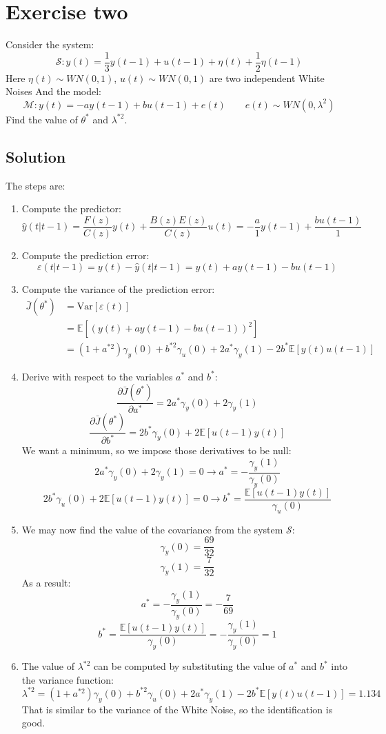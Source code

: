 \section{Exercise two}

Consider the system: 
\[\mathcal{S}:y(t)=\dfrac{1}{3}y(t-1)+u(t-1)+\eta(t)+\dfrac{1}{2}\eta(t-1)\]
Here $\eta(t)\sim WN(0,1)$, $u(t)\sim WN(0,1)$ are two independent White Noises
And the model: 
\[\mathcal{M}:y(t)=-ay(t-1)+bu(t-1)+e(t) \qquad e(t)\sim WN(0,\lambda^2)\]
Find the value of $\theta^\ast$ and $\lambda^{\ast 2}$. 

\subsection*{Solution}
The steps are: 
\begin{enumerate}
    \item Compute the predictor: 
        \[\hat{y}(t|t-1)=\dfrac{F(z)}{C(z)}y(t)+\dfrac{B(z)E(z)}{C(z)}u(t)=-\dfrac{a}{1}y(t-1)+\dfrac{bu(t-1)}{1}\]
    \item Compute the prediction error: 
        \[\varepsilon(t|t-1)=y(t)-\hat{y}(t|t-1)=y(t)+ay(t-1)-bu(t-1)\]
    \item Compute the variance of the prediction error: 
        \begin{align*}
            \bar{J}(\theta^\ast)    &=\text{Var}\left[\varepsilon(t)\right]\\   
                                    &=\mathbb{E}\left[ {\left(y(t)+ay(t-1)-bu(t-1)\right)}^2 \right] \\
                                    &=\left(1+a^{\ast 2}\right)\gamma_y(0)+b^{\ast 2}\gamma_u(0)+2a^\ast \gamma_y(1)-2b^\ast\mathbb{E}\left[y(t)u(t-1)\right]
        \end{align*}
    \item Derive with respect to the variables $a^\ast$ and $b^\ast$: 
        \[\dfrac{\partial\bar{J}(\theta^\ast)}{\partial a^\ast}=2a^\ast\gamma_y(0)+2\gamma_y(1)\]
        \[\dfrac{\partial\bar{J}(\theta^\ast)}{\partial b^\ast}=2b^\ast\gamma_y(0)+2\mathbb{E}\left[u(t-1)y(t)\right]\]
        We want a minimum, so we impose those derivatives to be null: 
        \[2a^\ast\gamma_y(0)+2\gamma_y(1)=0 \rightarrow a^\ast=-\dfrac{\gamma_y(1)}{\gamma_y(0)}\]
        \[2b^\ast\gamma_u(0)+2\mathbb{E}\left[u(t-1)y(t)\right]=0 \rightarrow b^\ast=\dfrac{\mathbb{E}\left[u(t-1)y(t)\right]}{\gamma_u(0)}\]
    \item We may now find the value of the covariance from the system $\mathcal{S}$: 
        \[\gamma_y(0)=\dfrac{69}{32}\]
        \[\gamma_y(1)=\dfrac{7}{32}\]
        As a result: 
        \[a^\ast=-\dfrac{\gamma_y(1)}{\gamma_y(0)}=-\dfrac{7}{69}\]
        \[b^\ast=\dfrac{\mathbb{E}\left[u(t-1)y(t)\right]}{\gamma_y(0)}=-\dfrac{\gamma_y(1)}{\gamma_y(0)}=1\]
    \item The value of $\lambda^{\ast 2}$ can be computed by substituting the value of $a^\ast$ and $b^\ast$ into the variance function: 
        \[\lambda^{\ast 2}=\left(1+a^{\ast 2}\right)\gamma_y(0)+b^{\ast 2}\gamma_u(0)+2a^\ast\gamma_y(1)-2b^\ast\mathbb{E}\left[y(t)u(t-1)\right]=1.134\]
        That is similar to the variance of the White Noise, so the identification is good. 
\end{enumerate}